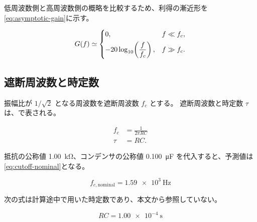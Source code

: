 
低周波数側と高周波数側の概略を比較するため、利得の漸近形を
\cref{eq:asymptotic-gain}に示す。

\begin{equation}
  G(f)\simeq
  \begin{dcases}
    0, & f\ll f_c,\\
    -20\log_{10}\!\left(\frac{f}{f_c}\right), & f\gg f_c.
  \end{dcases}
  \label{eq:asymptotic-gain}
\end{equation}


\subsection{遮断周波数と時定数}
\label{subsec:cutoff}

振幅比が $1/\sqrt{2}$ となる周波数を遮断周波数 $f_c$ とする。
遮断周波数と時定数 $\tau$ は、で表される。

\begin{align}
  f_c&=\frac{1}{2\pi RC}
    \label{eq:cutoff}\\
  \tau&=RC.
    \label{eq:tau}
\end{align}

抵抗の公称値 \qty{1.00}{\kilo\ohm}、コンデンサの公称値 \qty{0.100}{\micro\farad} を代入すると、予測値は\cref{eq:cutoff-nominal}となる。

\begin{equation}
  f_{c,\mathrm{nominal}}=\qty{1.59e3}{\hertz}
  \label{eq:cutoff-nominal}
\end{equation}

次の式は計算途中で用いた時定数であり、本文から参照していない。

\begin{equation}
  RC=\qty{1.00e-4}{\second}
  \label{eq:time-constant-unreferenced}
\end{equation}

